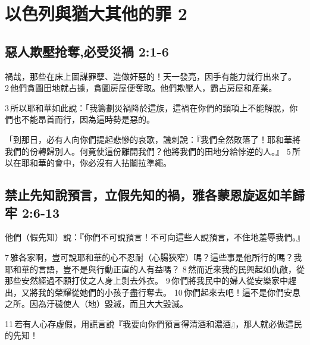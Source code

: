 \section{以色列與猶大其他的罪 2}

\subsection{惡人欺壓抢奪,必受災禍 2:1-6}
禍哉，那些在床上圖謀罪孽、造做奸惡的！天一發亮，因手有能力就行出來了。 2 他們貪圖田地就占據，貪圖房屋便奪取。他們欺壓人，霸占房屋和產業。 

3 所以耶和華如此說：「我籌劃災禍降於這族，這禍在你們的頸項上不能解脫，你們也不能昂首而行，因為這時勢是惡的。

「到那日，必有人向你們提起悲慘的哀歌，譏刺說：『我們全然敗落了！耶和華將我們的份轉歸別人。何竟使這份離開我們？他將我們的田地分給悖逆的人。』 5 所以在耶和華的會中，你必沒有人拈鬮拉準繩。

\subsection{禁止先知說預言，立假先知的禍，雅各蒙恩旋返如羊歸牢 2:6-13}
他們（假先知）說：『你們不可說預言！不可向這些人說預言，不住地羞辱我們。』 

7 雅各家啊，豈可說耶和華的心不忍耐（心腸狹窄）嗎？這些事是他所行的嗎？我耶和華的言語，豈不是與行動正直的人有益嗎？ 8 然而近來我的民興起如仇敵，從那些安然經過不願打仗之人身上剝去外衣。 9 你們將我民中的婦人從安樂家中趕出，又將我的榮耀從她們的小孩子盡行奪去。 10 你們起來去吧！這不是你們安息之所。因為汙穢使人（地）毀滅，而且大大毀滅。 

11 若有人心存虛假，用謊言說『我要向你們預言得清酒和濃酒』，那人就必做這民的先知！


